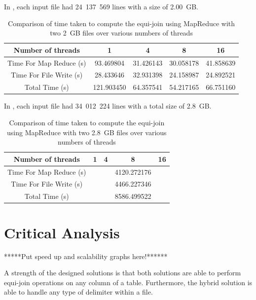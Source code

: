 \documentclass[10pt,twocolumn]{witseiepaper}
\begin{document}
In , each input file had 24~137~569  lines with a size of 2.00~GB. 

\begin{table} [t]
	\centering
	\caption{Comparison of time taken to compute the equi-join using MapReduce with two 2~GB files over various numbers of threads}
	\label{tab:results3}
	
	\begin{tabular}{|c|c|c|c|c|}
		\hline 
		Number of threads & 1 & 4 & 8 &16\\ 
		\hline
		\hline
		Time For Map Reduce (s) & 93.469804 & 31.426143 & 30.058178 & 41.858639\\ 
		\hline 
		Time For File Write (s) & 28.433646 & 32.931398& 24.158987 & 24.892521\\ 
		\hline 
		Total Time (s) & 121.903450 & 64.357541 & 54.217165 & 66.751160 \\ 
		\hline 
	\end{tabular} 
\end{table}


In , each input file had 34~012~224   lines with a total size of 2.8~GB. 

\begin{table} [t]
	\centering
	\caption{Comparison of time taken to compute the equi-join using MapReduce with two 2.8~GB files over various numbers of threads}
	\label{tab:results4}
	
	\begin{tabular}{|c|c|c|c|c|}
		\hline 
		Number of threads & 1 & 4 & 8 &16\\ 
		\hline
		\hline
		Time For Map Reduce (s) &  &  & 4120.272176 & \\ 
		\hline 
		Time For File Write (s) &  & & 4466.227346 & \\ 
		\hline 
		Total Time (s) &  &  & 8586.499522 &  \\ 
		\hline 
	\end{tabular} 
\end{table}

\section{Critical Analysis}

*****Put speed up and scalability graphs here!******


A strength of the designed solutions is that both solutions are able to perform equi-join operations on any column of a table. Furthermore, the hybrid solution is able to handle any type of delimiter within a file.
\end{document}
